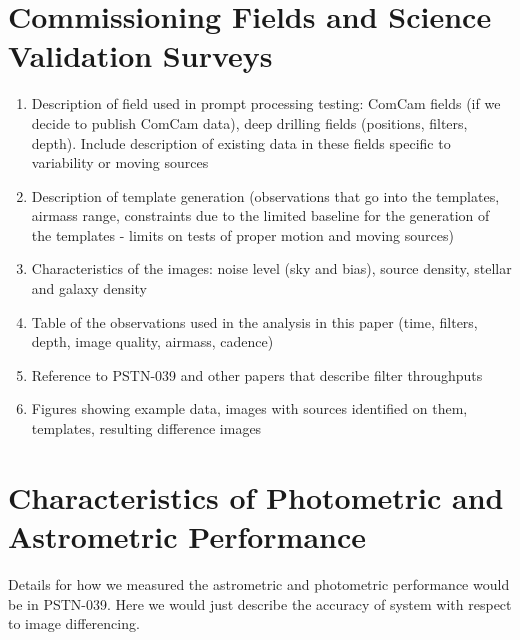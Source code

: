\section{Commissioning Fields and Science Validation Surveys}
\label{sec:fields}

\begin{enumerate}

    \item Description of field used in prompt processing testing: ComCam fields (if we decide to publish ComCam data), 
    deep drilling fields (positions, filters, depth). Include description of existing data in these fields specific to variability 
    or moving sources
    \item Description of template generation (observations that go into the templates, airmass range, constraints due to 
    the limited baseline for the generation of the templates - limits on tests of proper motion and moving sources)
    \item Characteristics of the images: noise level (sky and bias), source density, stellar and galaxy density 
    \item Table of the observations used in the analysis in this paper (time, filters, depth, image quality, airmass, cadence)
    \item Reference to PSTN-039 and other papers that describe filter throughputs
    \item Figures showing example data, images with sources identified on them, templates, resulting difference images

\end{enumerate}


\section{Characteristics of Photometric and Astrometric Performance}

Details for how we measured the astrometric and photometric performance would be in PSTN-039. Here we would just describe the 
accuracy of system with respect to  image differencing.

